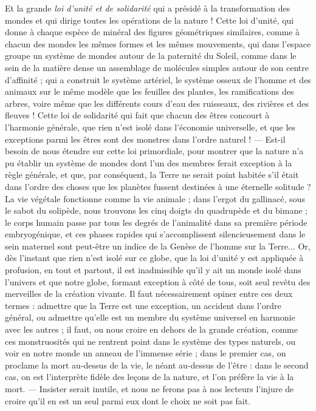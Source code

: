 \documentclass[a4paper, 11pt, oneside]{article}
\begin{document}
Et la grande \emph{loi d'unité et de solidarité} qui a présidé à la transformation des mondes et qui dirige toutes les opérations de la nature ! Cette loi d'unité, qui donne à chaque espèce de minéral des figures géométriques similaires, comme à chacun des mondes les mêmes formes et les mêmes mouvements, qui dans l'espace groupe un système de mondes autour de la paternité du Soleil, comme dans le sein de la matière dense un assemblage de molécules simples autour de son centre d'affinité ; qui a construit le système artériel, le système osseux de l'homme et des animaux sur le même modèle que les feuilles des plantes, les ramifications des arbres, voire même que les différents cours d'eau des ruisseaux, des rivières et des fleuves ! Cette loi de solidarité qui fait que chacun des êtres concourt à l'harmonie générale, que rien n'est isolé dans l'économie universelle, et que les exceptions parmi les êtres sont des monstres dans l'ordre naturel ! --- Est-il besoin de nous étendre sur cette loi primordiale, pour montrer que la nature n'a pu établir un système de mondes dont l'un des membres ferait exception à la règle générale, et que, par conséquent, la Terre ne serait point habitée s'il était dans l'ordre des choses que les planètes fussent destinées à une éternelle solitude ? La vie végétale fonctionne comme la vie animale ; dans l'ergot du gallinacé, sous le sabot du solipède, nous trouvons les cinq doigts du quadrupède et du bimane ; le corps humain passe par tous les degrés de l'animalité dans sa première période embryogénique, et ces phases rapides qui s'accomplissent silencieusement dans le sein maternel sont peut-être un indice de la Genèse de l'homme sur la Terre... Or, dès l'instant que rien n'est isolé sur ce globe, que la loi d'unité y est appliquée à profusion, en tout et partout, il est inadmissible qu'il y ait un monde isolé dans l'univers et que notre globe, formant exception à côté de tous, soit seul revêtu des merveilles de la création vivante. Il faut nécessairement opiner entre ces deux termes : admettre que la Terre est une exception, un accident dans l'ordre général, ou admettre qu'elle est un membre du système universel en harmonie avec les autres ; il faut, ou nous croire en dehors de la grande création, comme ces monstruosités qui ne rentrent point dans le système des types naturels, ou voir en notre monde un anneau de l'immense série ; dans le premier cas, on proclame la mort au-dessus de la vie, le néant au-dessus de l'être : dans le second cas, on est l'interprète fidèle des leçons de la nature, et l'on préfère la vie à la mort. --- Insister serait inutile, et nous ne ferons pas à nos lecteurs l'injure de croire qu'il en est un seul parmi eux dont le choix ne soit pas fait.
\end{document}

